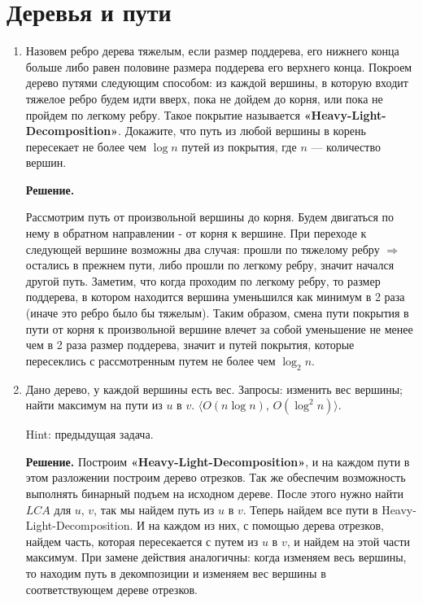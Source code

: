 \section*{Деревья и пути}
\begin{enumerate}
	\item Назовем ребро дерева тяжелым, если размер поддерева, его нижнего конца больше либо равен 
	половине размера поддерева его верхнего конца. Покроем дерево путями следующим способом: из 
	каждой вершины, в которую входит тяжелое ребро будем идти вверх, пока не дойдем до корня, 
	или пока не пройдем по легкому ребру. Такое покрытие называется 
	\textbf{«Heavy-Light-Decomposition»}. Докажите, что путь из любой вершины в корень пересекает 
	не более чем $\log n$ путей из покрытия, где $n$ — количество вершин.
	
	\textbf{Решение.} 
	
	Рассмотрим путь от произвольной вершины до корня. Будем двигаться по нему 
	в обратном направлении - от корня к вершине. При переходе к следующей вершине возможны два 
	случая: прошли по тяжелому ребру $\Rightarrow$ остались в прежнем пути, либо прошли по 
	легкому ребру, значит начался другой путь. Заметим, что когда проходим по легкому ребру, то 
	размер поддерева, в котором находится вершина уменьшился как минимум в 2 раза (иначе это 
	ребро было бы тяжелым). Таким образом, смена пути покрытия в пути от корня к произвольной 
	вершине влечет за собой уменьшение не менее чем в 2 раза размер поддерева, значит и путей 
	покрытия, которые пересеклись с рассмотренным путем не более чем $\log_2 n$.
	
	\item Дано дерево, у каждой вершины есть вес. Запросы: 
	изменить вес вершины; 
	найти максимум на пути из $u$ в $v$. $\langle O(n \log n)$, $O(\log^2 n) \rangle$. 
	
	Hint: предыдущая задача.
	
	\textbf{Решение.} Построим \textbf{«Heavy-Light-Decomposition»}, и на 
	каждом пути в этом разложении построим дерево отрезков. Так же 
	обеспечим возможность выполнять бинарный подъем на исходном дереве. 
	После этого нужно найти $LCA$ для $u$, $v$, так мы найдем путь из $u$ 
	в $v$. Теперь найдем все пути в Heavy-Light-Decomposition. И на каждом 
	из них, с помощью дерева отрезков, найдем часть, которая пересекается 
	с путем из $u$ в $v$, и найдем на этой части максимум. При замене 
	действия аналогичны: когда изменяем весь вершины, то находим путь в 
	декомпозиции и изменяем вес вершины в соответствующем дереве отрезков.
	

\end{enumerate}
